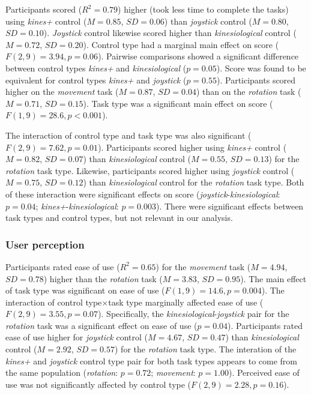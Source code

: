 \documentclass{sigchi}
\begin{document}
Participants scored ($R^{2}=0.79$) higher (took less time to complete the tasks) using \textit{kines+} control ($M=0.85$, $SD=0.06$) than \textit{joystick} control ($M=0.80$, $SD=0.10$). \textit{Joystick} control likewise scored higher than \textit{kinesiological} control ($M=0.72$, $SD=0.20$). Control type had a marginal main effect on score ($F(2, 9)=3.94, p=0.06$). Pairwise comparisons showed a significant difference between control types \textit{kines+} and \textit{kinesiological} ($p=0.05$). Score was found to be equivalent for control types \textit{kines+} and \textit{joystick} ($p=0.55$). Participants scored higher on the \textit{movement} task ($M=0.87$, $SD=0.04$) than on the \textit{rotation} task ($M=0.71$, $SD=0.15$). Task type was a significant main effect on score ($F(1, 9)=28.6, p<0.001$).

The interaction of control type and task type was also significant ($F(2, 9)=7.62, p=0.01$). Participants scored higher using \textit{kines+} control ($M=0.82$, $SD=0.07$) than \textit{kinesiological} control ($M=0.55$, $SD=0.13$) for the \textit{rotation} task type. Likewise,  participants scored higher using \textit{joystick} control ($M=0.75$, $SD=0.12$) than \textit{kinesiological} control for the \textit{rotation} task type. Both of these interaction were significant effects on score (\textit{joystick}-\textit{kinesiological}: $p=0.04$; \textit{kines+}-\textit{kinesiological}: $p=0.003$). 
There were significant effects between task types and control types, but not relevant in our analysis.

\subsubsection{User perception}

Participants rated ease of use ($R^{2}=0.65$) for the \textit{movement} task ($M=4.94$, $SD=0.78$) higher than the \textit{rotation} task ($M=3.83$, $SD=0.95$). The main effect of task type was significant on ease of use ($F(1, 9)=14.6, p=0.004$). The interaction of control type$\times$task type marginally affected ease of use ($F(2, 9)=3.55, p=0.07$). Specifically, the \textit{kinesiological}-\textit{joystick} pair for the \textit{rotation} task was a significant effect on ease of use ($p=0.04$). Participants rated ease of use higher for \textit{joystick} control ($M=4.67$, $SD=0.47$) than \textit{kinesiological} control ($M=2.92$, $SD=0.57$) for the \textit{rotation} task type. 
The interation of the \textit{kines+} and \textit{joystick} control type pair for both task types appears to come from the same population (\textit{rotation}: $p=0.72$; \textit{movement}: $p=1.00$). Perceived ease of use was not significantly affected by control type ($F(2, 9)=2.28, p=0.16$).
\end{document}
